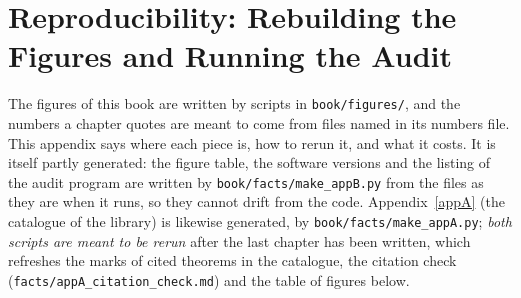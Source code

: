 \chapter{Reproducibility: Rebuilding the Figures and Running the Audit}\label{appB}
\noindent The figures of this book are written by scripts in \texttt{book/\allowbreak{}figures/\allowbreak{}}, and the numbers a chapter quotes are meant to come from files named in its numbers file. This appendix says where each piece is, how to rerun it, and what it costs. It is itself partly generated: the figure table, the software versions and the listing of the audit program are written by \texttt{book/\allowbreak{}facts/\allowbreak{}make\_\allowbreak{}appB.\allowbreak{}py} from the files as they are when it runs, so they cannot drift from the code. Appendix~\ref{appA} (the catalogue of the library) is likewise generated, by \texttt{book/\allowbreak{}facts/\allowbreak{}make\_\allowbreak{}appA.\allowbreak{}py}; \emph{both scripts are meant to be rerun} after the last chapter has been written, which refreshes the marks of cited theorems in the catalogue, the citation check (\texttt{facts/\allowbreak{}appA\_\allowbreak{}citation\_\allowbreak{}check.\allowbreak{}md}) and the table of figures below.
